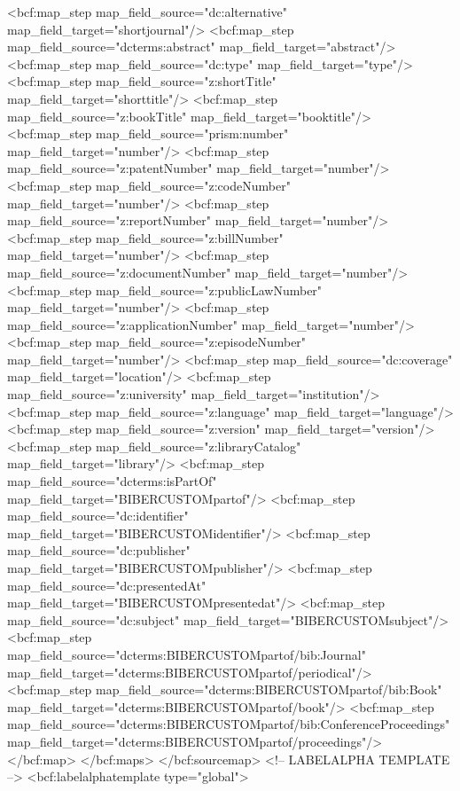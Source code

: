         <bcf:map_step map_field_source="dc:alternative" map_field_target="shortjournal"/>
        <bcf:map_step map_field_source="dcterms:abstract" map_field_target="abstract"/>
        <bcf:map_step map_field_source="dc:type" map_field_target="type"/>
        <bcf:map_step map_field_source="z:shortTitle" map_field_target="shorttitle"/>
        <bcf:map_step map_field_source="z:bookTitle" map_field_target="booktitle"/>
        <bcf:map_step map_field_source="prism:number" map_field_target="number"/>
        <bcf:map_step map_field_source="z:patentNumber" map_field_target="number"/>
        <bcf:map_step map_field_source="z:codeNumber" map_field_target="number"/>
        <bcf:map_step map_field_source="z:reportNumber" map_field_target="number"/>
        <bcf:map_step map_field_source="z:billNumber" map_field_target="number"/>
        <bcf:map_step map_field_source="z:documentNumber" map_field_target="number"/>
        <bcf:map_step map_field_source="z:publicLawNumber" map_field_target="number"/>
        <bcf:map_step map_field_source="z:applicationNumber" map_field_target="number"/>
        <bcf:map_step map_field_source="z:episodeNumber" map_field_target="number"/>
        <bcf:map_step map_field_source="dc:coverage" map_field_target="location"/>
        <bcf:map_step map_field_source="z:university" map_field_target="institution"/>
        <bcf:map_step map_field_source="z:language" map_field_target="language"/>
        <bcf:map_step map_field_source="z:version" map_field_target="version"/>
        <bcf:map_step map_field_source="z:libraryCatalog" map_field_target="library"/>
        <bcf:map_step map_field_source="dcterms:isPartOf" map_field_target="BIBERCUSTOMpartof"/>
        <bcf:map_step map_field_source="dc:identifier" map_field_target="BIBERCUSTOMidentifier"/>
        <bcf:map_step map_field_source="dc:publisher" map_field_target="BIBERCUSTOMpublisher"/>
        <bcf:map_step map_field_source="dc:presentedAt" map_field_target="BIBERCUSTOMpresentedat"/>
        <bcf:map_step map_field_source="dc:subject" map_field_target="BIBERCUSTOMsubject"/>
        <bcf:map_step map_field_source="dcterms:BIBERCUSTOMpartof/bib:Journal" map_field_target="dcterms:BIBERCUSTOMpartof/periodical"/>
        <bcf:map_step map_field_source="dcterms:BIBERCUSTOMpartof/bib:Book" map_field_target="dcterms:BIBERCUSTOMpartof/book"/>
        <bcf:map_step map_field_source="dcterms:BIBERCUSTOMpartof/bib:ConferenceProceedings" map_field_target="dcterms:BIBERCUSTOMpartof/proceedings"/>
      </bcf:map>
    </bcf:maps>
  </bcf:sourcemap>
  <!-- LABELALPHA TEMPLATE -->
  <bcf:labelalphatemplate type="global">
